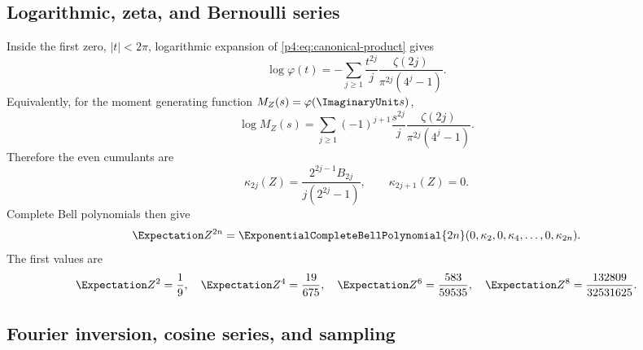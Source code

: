 \documentclass[11pt]{article}
\theoremstyle{definition}
\theoremstyle{remark}
\newcommand{\phiF}{\varphi}
\begin{document}
\subsection{Logarithmic, zeta, and Bernoulli series}

Inside the first zero, \(|t|<2\pi\), logarithmic expansion of
\eqref{p4:eq:canonical-product} gives
\begin{equation}
 \log\phiF(t)
 =-\sum_{j\ge1}\frac{t^{2j}}{j}
 \frac{\zeta(2j)}{\pi^{2j}(4^j-1)}.
 \label{p4:eq:log-trace-series-preview}
\end{equation}
Equivalently, for the moment generating function \(M_Z(s)=\phiF(\ImaginaryUnit s)\),
\begin{equation}
 \log M_Z(s)=\sum_{j\ge1}(-1)^{j+1}\frac{s^{2j}}{j}
 \frac{\zeta(2j)}{\pi^{2j}(4^j-1)}.
 \label{p4:eq:mgf-log-series}
\end{equation}
Therefore the even cumulants are
\begin{equation}
 \kappa_{2j}(Z)
 =\frac{2^{2j-1}B_{2j}}{j(2^{2j}-1)},
 \qquad \kappa_{2j+1}(Z)=0.
 \label{p4:eq:cumulants}
\end{equation}
Complete Bell polynomials then give
\begin{equation}
 \Expectation Z^{2n}=\ExponentialCompleteBellPolynomial{2n}(0,\kappa_2,0,\kappa_4,\ldots,0,\kappa_{2n}).
 \label{p4:eq:bell-moments}
\end{equation}
The first values are
\begin{equation}
 \Expectation Z^2=\frac19,\quad
 \Expectation Z^4=\frac{19}{675},\quad
 \Expectation Z^6=\frac{583}{59535},\quad
 \Expectation Z^8=\frac{132809}{32531625}.
 \label{p4:eq:first-moments}
\end{equation}

\subsection{Fourier inversion, cosine series, and sampling}
\end{document}

